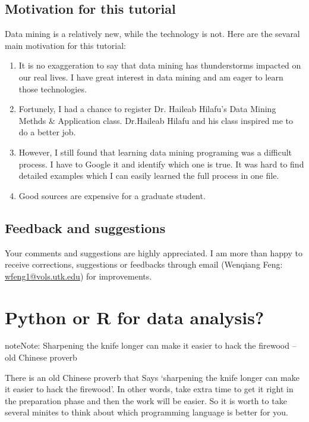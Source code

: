 \documentclass[letterpaper,11pt,english]{sphinxmanual}
\begin{document}
\section{Motivation for this tutorial}
\label{preface:sphinx}\label{preface:motivation-for-this-tutorial}
Data mining is a relatively new, while the technology is not. Here are the sevaral main motivation for this
tutorial:
\begin{enumerate}
\item {} 
It is no exaggeration to say that data mining has thunderstorms impacted on our real lives. I have great interest in data mining and am eager to learn those technologies.

\item {} 
Fortunely, I had a chance to register Dr. Haileab Hilafu's Data Mining Methds \& Application class. Dr.Haileab Hilafu and his class inspired me to do a better job.

\item {} 
However, I still found that learning data mining programing was a difficult process. I have to Google it and identify which one is true. It was hard to find detailed examples which I can easily learned the full process in one file.

\item {} 
Good sources are expensive for a graduate student.

\end{enumerate}


\section{Feedback and suggestions}
\label{preface:feedback-and-suggestions}
Your comments and suggestions are highly appreciated. I am more than happy to receive
corrections, suggestions or feedbacks through email (Wenqiang Feng: \href{mailto:wfeng1@vols.utk.edu}{wfeng1@vols.utk.edu}) for improvements.


\chapter{Python or R for data analysis?}
\label{comparison:comparison}\label{comparison:python-or-r-for-data-analysis}\label{comparison::doc}
\begin{notice}{note}{Note:}
Sharpening the knife longer can make it easier to hack the firewood -- old Chinese proverb
\end{notice}

There is an old Chinese proverb that Says ‘sharpening the knife longer can make it easier to hack the firewood'.  In other words, take extra time to get it right in the preparation phase and then the work will be easier. So it is worth to take several minites to think about which programming language is better for you.
\end{document}
